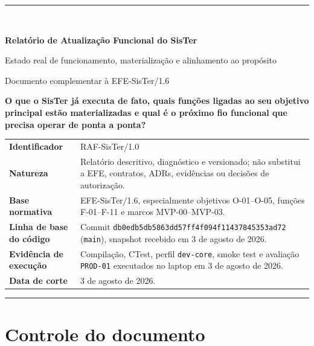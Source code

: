 \documentclass[11pt,a4paper,oneside]{article}
\begin{document}
\begin{titlepage}
\pagestyle{empty}
\thispagestyle{empty}
\vspace*{1.7cm}
{\color{sisterblue}\rule{\textwidth}{1.2pt}}\\[1.0cm]
{\Huge\bfseries Relatório de Atualização Funcional do SisTer\par}
\vspace{0.38cm}
{\Large Estado real de funcionamento, materialização e alinhamento ao propósito\par}
\vspace{0.18cm}
{\large Documento complementar à EFE-SisTer/1.6\par}
\vspace{1.0cm}
\begin{principio}
\centering\Large\textbf{O que o SisTer já executa de fato, quais funções ligadas ao seu objetivo principal estão materializadas e qual é o próximo fio funcional que precisa operar de ponta a ponta?}
\end{principio}
\vfill
\begin{tabularx}{\textwidth}{P{4.2cm}Y}
\toprule
\textbf{Identificador} & RAF-SisTer/1.0 \\
\textbf{Natureza} & Relatório descritivo, diagnóstico e versionado; não substitui a EFE, contratos, ADRs, evidências ou decisões de autorização. \\
\textbf{Base normativa} & EFE-SisTer/1.6, especialmente objetivos O-01--O-05, funções F-01--F-11 e marcos MVP-00--MVP-03. \\
\textbf{Linha de base do código} & Commit \texttt{db0edb5db5863dd57ff4f094f11437845353ad72} (\texttt{main}), snapshot recebido em 3 de agosto de 2026. \\
\textbf{Evidência de execução} & Compilação, CTest, perfil \texttt{dev-core}, smoke test e avaliação \texttt{PROD-01} executados no laptop em 3 de agosto de 2026. \\
\textbf{Data de corte} & 3 de agosto de 2026. \\
\bottomrule
\end{tabularx}
\vspace{1.0cm}
{\color{sisterblue}\rule{\textwidth}{1.2pt}}
\thispagestyle{empty}
\end{titlepage}
\pagestyle{fancy}

\section*{Controle do documento}
\end{document}
